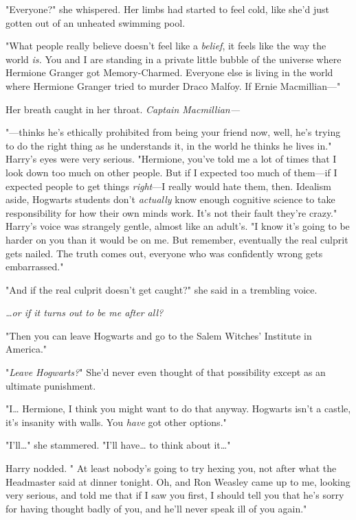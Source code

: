 "Everyone?" she whispered. Her limbs had started to feel cold, like she'd just
gotten out of an unheated swimming pool.

"What people really believe doesn't feel like a \emph{belief}, it feels like
the way the world \emph{is.} You and I are standing in a private little bubble
of the universe where Hermione Granger got Memory-Charmed. Everyone else is
living in the world where Hermione Granger tried to murder Draco Malfoy. If
Ernie Macmillian---"

Her breath caught in her throat. \emph{Captain Macmillian---}

"---thinks he's ethically prohibited from being your friend now, well, he's
trying to do the right thing as he understands it, in the world he thinks he
lives in." Harry's eyes were very serious. "Hermione, you've told me a lot of
times that I look down too much on other people. But if I expected too much of
them---if I expected people to get things \emph{right}---I really would hate
them, then. Idealism aside, Hogwarts students don't \emph{actually} know enough
cognitive science to take responsibility for how their own minds work. It's not
their fault they're crazy." Harry's voice was strangely gentle, almost like an
adult's. "I know it's going to be harder on you than it would be on me. But
remember, eventually the real culprit gets nailed. The truth comes out,
everyone who was confidently wrong gets embarrassed."

"And if the real culprit doesn't get caught?" she said in a trembling voice.

\emph{{\ldots}or if it turns out to be me after all?}

"Then you can leave Hogwarts and go to the Salem Witches' Institute in America."

"\emph{Leave Hogwarts?}" She'd never even thought of that possibility except as
an ultimate punishment.

"I{\ldots} Hermione, I think you might want to do that anyway. Hogwarts isn't a
castle, it's insanity with walls. You \emph{have} got other options."

"I'll{\ldots}" she stammered. "I'll have{\ldots} to think about it{\ldots}"

Harry nodded. " At least nobody's going to try hexing you, not after what the
Headmaster said at dinner tonight. Oh, and Ron Weasley came up to me, looking
very serious, and told me that if I saw you first, I should tell you that he's
sorry for having thought badly of you, and he'll never speak ill of you again."

